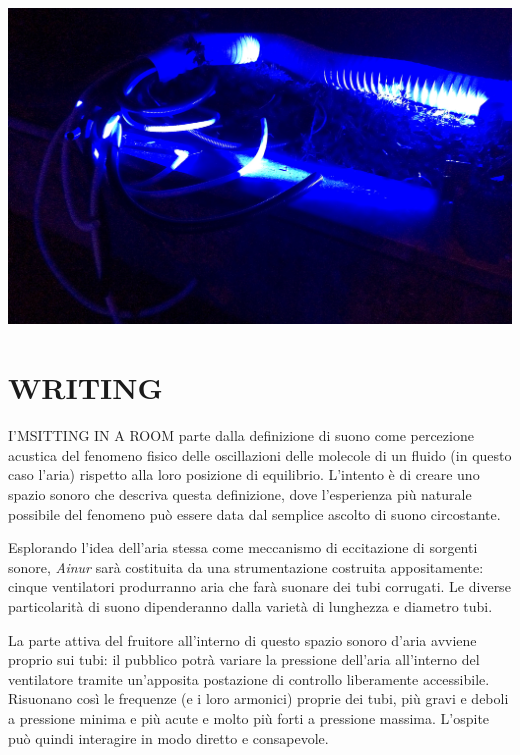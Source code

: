 \documentclass[
	a0,
	portrait
	]{a0poster}
\begin{document}
\begin{multicols}{4}

\begin{center}
\includegraphics[width=1.\linewidth]{IMG_2143}
\end{center}


\section*{\color{cyellow}WRITING}

\lettrine{I'M}{SITTING IN A ROOM} parte dalla definizione di suono come percezione acustica del fenomeno fisico delle oscillazioni delle molecole di un fluido (in questo caso l’aria) rispetto alla loro posizione di equilibrio. L’intento è di creare uno spazio sonoro che descriva questa definizione, dove l’esperienza più naturale possibile del fenomeno può essere data dal semplice ascolto di suono circostante.

Esplorando l’idea dell'aria stessa come meccanismo di eccitazione di sorgenti sonore, \emph{Ainur} sarà costituita da una strumentazione costruita appositamente: cinque ventilatori produrranno aria che farà suonare dei tubi corrugati. Le diverse particolarità di suono dipenderanno dalla varietà di lunghezza e diametro tubi. 

La parte attiva del fruitore all’interno di questo spazio sonoro d’aria avviene proprio sui tubi: il pubblico potrà variare la pressione dell’aria all’interno del ventilatore tramite un’apposita postazione di controllo liberamente accessibile. Risuonano così le frequenze (e i loro armonici) proprie dei tubi, più gravi e deboli a pressione minima e più acute e molto più forti a pressione massima. L’ospite può quindi interagire in modo diretto e consapevole. 


\end{multicols}
\end{document}
